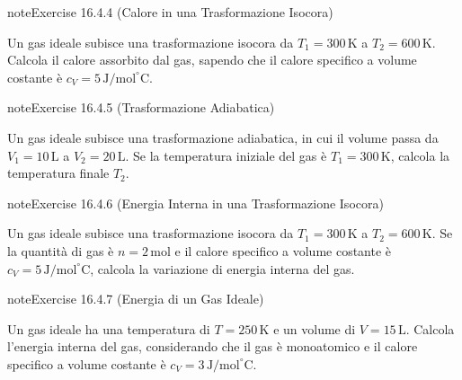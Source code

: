\documentclass[letterpaper,10pt,italian]{jupyterBook}
\begin{document}
\begin{sphinxadmonition}{note}{Exercise 16.4.4 (Calore in una Trasformazione Isocora)}



\sphinxAtStartPar
Un gas ideale subisce una trasformazione isocora da \(T_1 = 300 \, \text{K}\) a \(T_2 = 600 \, \text{K}\). Calcola il calore assorbito dal gas, sapendo che il calore specifico a volume costante è \(c_V = 5 \, \text{J/mol}^\circ \text{C}\).
\end{sphinxadmonition}
 \label{exercise:ch/thermodynamics/matter-problems-exercise-4}

\begin{sphinxadmonition}{note}{Exercise 16.4.5 (Trasformazione Adiabatica)}



\sphinxAtStartPar
Un gas ideale subisce una trasformazione adiabatica, in cui il volume passa da \(V_1 = 10 \, \text{L}\) a \(V_2 = 20 \, \text{L}\). Se la temperatura iniziale del gas è \(T_1 = 300 \, \text{K}\), calcola la temperatura finale \(T_2\).
\end{sphinxadmonition}
 \label{exercise:ch/thermodynamics/matter-problems-exercise-5}

\begin{sphinxadmonition}{note}{Exercise 16.4.6 (Energia Interna in una Trasformazione Isocora)}



\sphinxAtStartPar
Un gas ideale subisce una trasformazione isocora da \(T_1 = 300 \, \text{K}\) a \(T_2 = 600 \, \text{K}\). Se la quantità di gas è \(n = 2 \, \text{mol}\) e il calore specifico a volume costante è \(c_V = 5 \, \text{J/mol}^\circ \text{C}\), calcola la variazione di energia interna del gas.
\end{sphinxadmonition}
 \label{exercise:ch/thermodynamics/matter-problems-exercise-6}

\begin{sphinxadmonition}{note}{Exercise 16.4.7 (Energia di un Gas Ideale)}



\sphinxAtStartPar
Un gas ideale ha una temperatura di \(T = 250 \, \text{K}\) e un volume di \(V = 15 \, \text{L}\). Calcola l’energia interna del gas, considerando che il gas è monoatomico e il calore specifico a volume costante è \(c_V = 3 \, \text{J/mol}^\circ \text{C}\).
\end{sphinxadmonition}
 \label{exercise:ch/thermodynamics/matter-problems-exercise-7}
\end{document}

